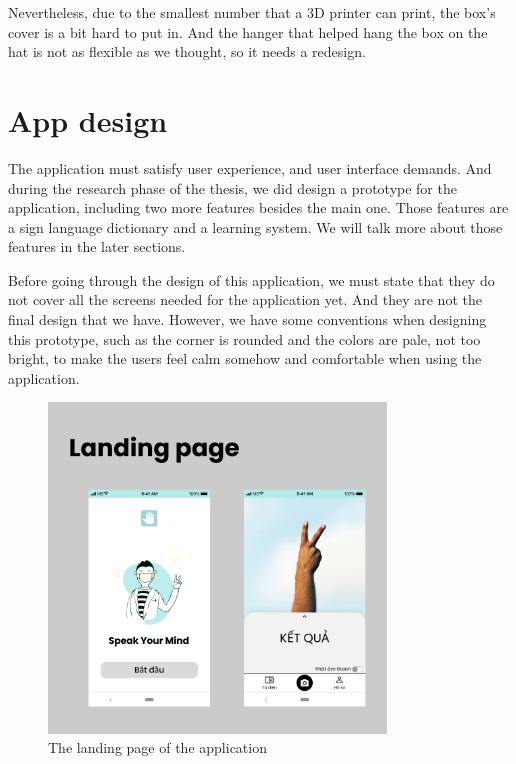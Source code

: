 Nevertheless, due to the smallest number that a 3D printer can print, the box's cover is a bit hard to put in. And the hanger that helped hang the box on the hat is not as flexible as we thought, so it needs a redesign.

\section{App design}

The application must satisfy user experience, and user interface demands. And during the research phase of the thesis, we did design a prototype for the application, including two more features besides the main one. Those features are a sign language dictionary and a learning system. We will talk more about those features in the later sections.

Before going through the design of this application, we must state that they do not cover all the screens needed for the application yet. And they are not the final design that we have. However, we have some conventions when designing this prototype, such as the corner is rounded and the colors are pale, not too bright, to make the users feel calm somehow and comfortable when using the application.

\begin{figure}[H]
	\centering
	\includegraphics[width=0.8\textwidth]{img/Chap5/Landing_page.png}
	\caption{The landing page of the application}
\end{figure}

